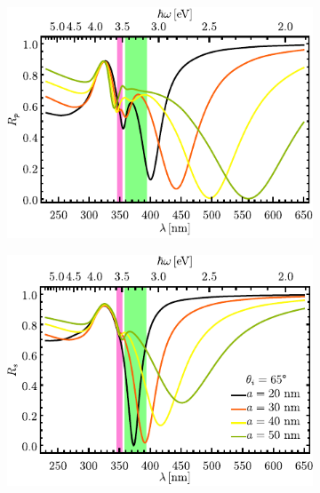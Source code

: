 \begin{figure}[h!]
	\hspace*{-1.5em}
	\begin{subfigure}{.01\linewidth}\caption{}\label{sfig:Ag-cutp-Rad}\vspace{4.5cm}\end{subfigure}
	\begin{subfigure}{.45\linewidth}\hspace*{-1.5em}
	\includegraphics[scale=1]{2-Resultados/figs/9-AgrVar/cut_angle_65_p.pdf}\end{subfigure}
	\begin{subfigure}{.01\linewidth}\caption{}\label{sfig:Ag-cuts-Rad}\vspace{4.5cm}\end{subfigure}\hspace*{-1.em}
	\begin{subfigure}{.45\linewidth}\centering
	\includegraphics[scale=1 ]{2-Resultados/figs/9-AgrVar/cut_angle_65_s.pdf}\end{subfigure}\vspace*{-.7em}

\end{figure}
